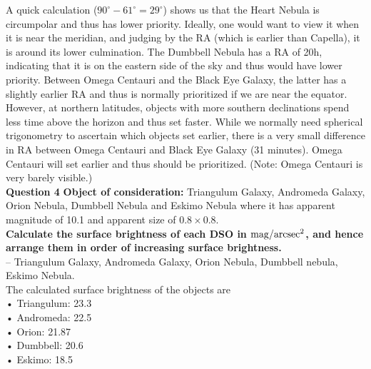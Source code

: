 \documentclass[a4paper,12pt]{extarticle}
\begin{document}
    A quick calculation ($90^\circ-61^\circ= 29^\circ$) shows us that the Heart Nebula is circumpolar and thus has lower priority. Ideally, one would want to view it when it is near the meridian, and judging by the RA (which is earlier than Capella), it is around its lower culmination. The Dumbbell Nebula has a RA of 20h, indicating that it is on the eastern side of the sky and thus would have lower priority. Between Omega Centauri and the Black Eye Galaxy, the latter has a slightly earlier RA and thus is normally prioritized if we are near the equator. However, at northern latitudes, objects with more southern declinations spend less time above the horizon and thus set faster. While we normally need spherical trigonometry to ascertain which objects set earlier, there is a very small difference in RA between Omega Centauri and Black Eye Galaxy (31 minutes). Omega Centauri will set earlier and thus should be prioritized. (Note: Omega Centauri is very barely visible.)\\
 
 
\textsf{\textbf{Question 4}} \textbf{Object of consideration:} Triangulum Galaxy, Andromeda Galaxy, Orion Nebula, Dumbbell Nebula and Eskimo Nebula where it has apparent magnitude of 10.1 and apparent size of $0.8\times 0.8$. \\ 

\textbf{Calculate the surface brightness of each DSO in $\rm mag/arcsec^2$, and hence arrange them in order of increasing surface brightness.} \\

-- Triangulum Galaxy, Andromeda Galaxy, Orion Nebula, Dumbbell nebula, Eskimo
Nebula.\\
The calculated surface brightness of the objects are\\
• Triangulum: 23.3\\
• Andromeda: 22.5\\
• Orion: 21.87\\
• Dumbbell: 20.6\\
• Eskimo: 18.5\\

\vspace{1.5 cm}
\end{document}
